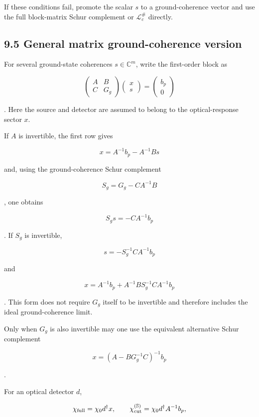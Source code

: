 \documentclass[
  10pt,
  a4paper,
]{article}
\begin{document}
If these conditions fail, promote the scalar \(s\) to a ground-coherence
vector and use the full block-matrix Schur complement or
\(\mathcal L_c^\#\) directly.

\subsection{9.5 General matrix ground-coherence
version}\label{general-matrix-ground-coherence-version}

For several ground-state coherences \(s\in\mathbb C^m\), write the
first-order block as

\[
\begin{pmatrix}
A&B\\
C&G_g
\end{pmatrix}
\begin{pmatrix}x\\s\end{pmatrix}
=
\begin{pmatrix}b_p\\0\end{pmatrix}
\]

. Here the source and detector are assumed to belong to the
optical-response sector \(x\).

If \(A\) is invertible, the first row gives

\[
x=A^{-1}b_p-A^{-1}Bs
\]

and, using the ground-coherence Schur complement

\[
\boxed{
S_g=G_g-CA^{-1}B
}
\]

, one obtains

\[
S_gs=-CA^{-1}b_p
\]

. If \(S_g\) is invertible,

\[
\boxed{
s=-S_g^{-1}CA^{-1}b_p
}
\]

and

\[
\boxed{
x=A^{-1}b_p
+A^{-1}BS_g^{-1}CA^{-1}b_p
}
\]

. This form does not require \(G_g\) itself to be invertible and
therefore includes the ideal ground-coherence limit.

Only when \(G_g\) is also invertible may one use the equivalent
alternative Schur complement

\[
\boxed{
x=(A-BG_g^{-1}C)^{-1}b_p
}
\]

.

For an optical detector \(d\),

\[
\chi_{\rm full}
=\chi_0d^\dagger x,
\qquad
\chi_{\rm cut}^{(\mathbb S)}
=\chi_0d^\dagger A^{-1}b_p,
\]
\end{document}
